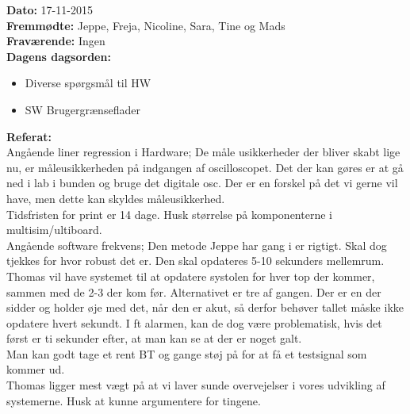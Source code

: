 \textbf{Dato:} 17-11-2015\\

\textbf{Fremmødte:} Jeppe, Freja, Nicoline, Sara, Tine og Mads\\

\textbf{Fraværende:} Ingen\\

\textbf{Dagens dagsorden:}
\begin{itemize}
	\item Diverse spørgsmål til HW 
	\item SW Brugergrænseflader
\end{itemize}

\textbf{Referat:}\\

Angående liner regression i Hardware; De måle usikkerheder der bliver skabt lige nu, er måleusikkerheden på indgangen af oscilloscopet. Det der kan gøres er at gå ned i lab i bunden og bruge det digitale osc. Der er en forskel på det vi gerne vil have, men dette kan skyldes måleusikkerhed.\\

Tidsfristen for print er 14 dage. Husk størrelse på komponenterne i multisim/ultiboard. \\

Angående software frekvens; Den metode Jeppe har gang i er rigtigt. Skal dog tjekkes for hvor robust det er. Den skal opdateres 5-10 sekunders mellemrum. Thomas vil have systemet til at opdatere systolen for hver top der kommer, sammen med de 2-3 der kom før. Alternativet er tre af gangen. Der er en der sidder og holder øje med det, når den er akut, så derfor behøver tallet måske ikke opdatere hvert sekundt. I ft alarmen, kan de dog være problematisk, hvis det først er ti sekunder efter, at man kan se at der er noget galt.\\

Man kan godt tage et rent BT og gange støj på for at få et testsignal som kommer ud.\\ 

Thomas ligger mest vægt på at vi laver sunde overvejelser i vores udvikling af systemerne. Husk at kunne argumentere for tingene. 